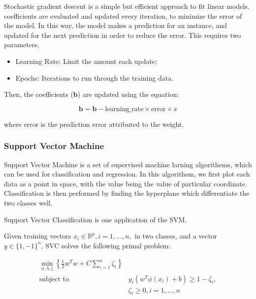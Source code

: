 \documentclass[12pt,a4paper]{report}
\begin{document}
          Stochastic gradient descent is a simple but efficient approach to fit linear models. coefficients are evaluated and updated every iteration, to minimize the error of the model. In this way, the model makes a prediction for an instance, and updated for the next prediction in order to reduce the error. This requires two parameters,

          \begin{itemize}
            \item{Learning Rate}: Limit the amount each update;
            \item{Epochs}: Iterations to run through the training data.
          \end{itemize}

          Then, the coefficients ($\mathbf{b}$) are updated using the equation:

          $$
            \mathbf{b} = \mathbf{b} - \text{learning\_rate} \times \text{error} \times x
          $$

          where $\text{error}$ is the prediction error attributed to the weight.


      \subsubsection{Support Vector Machine}

        Support Vector Machine is a set of supervised machine larning algorithems, which can be used for classification and regression. In this algorithem, we first plot each data as a point in space, with the value being the value of particular coordinate. Classification is then performed by finding the hyperplane which differentiate the two classes well.

        Support Vector Classification is one application of the SVM.

        Given training vectors $x_i \in \mathbb{R}^p, i=1, \dots, n,$ in two classes, and a vector $y \in \{1, -1\}^n$, SVC solves the following primal problem:

        \[
          \begin{aligned}
            \min_ {w, b, \zeta} \left\{ \frac{1}{2} w^T w + C \sum_{i=1}^{n} \zeta_i \right\} \\
            \textrm {subject to } & y_i (w^T \phi (x_i) + b) \geq 1 - \zeta_i,                \\
                                  & \zeta_i \geq 0, i=1, ..., n
          \end{aligned}
        \]
\end{document}

